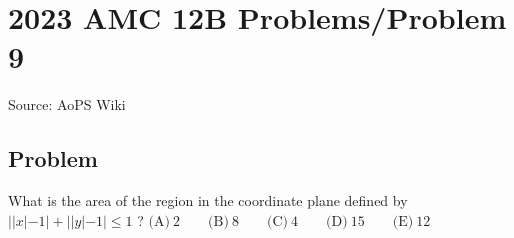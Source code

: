 \documentclass[12pt]{article}
\begin{document}
\section*{{2023 AMC 12B Problems/Problem 9}}
Source: AoPS Wiki

\subsection*{Problem}
What is the area of the region in the coordinate plane defined by $| | x | - 1 | + | | y | - 1 | \le 1$ ? $\text{(A)}\ 2 \qquad \text{(B)}\ 8 \qquad \text{(C)}\ 4 \qquad \text{(D)}\ 15 \qquad \text{(E)}\ 12$
\end{document}
